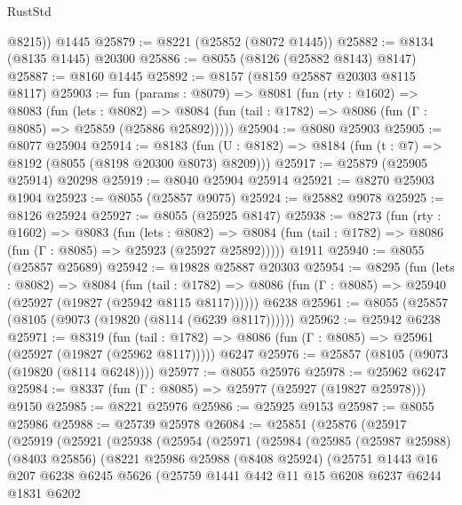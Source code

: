 \begin{lexlean}{RustStd}
\begin{coremodule}
        @8215))
    @1445
@25879 := @8221 (@25852 (@8072 @1445))
@25882 := @8134 (@8135 @1445) @20300
@25886 := @8055 (@8126 (@25882 @8143) @8147)
@25887 := @8160 @1445
@25892 := @8157 (@8159 @25887 @20303 @8115 @8117)
@25903 := fun (params : @8079) =>
  @8081
    (fun (rty : @1602) =>
    @8083
      (fun (lets : @8082) =>
      @8084 (fun (tail : @1782) => @8086 (fun (Γ : @8085) => @25859 (@25886 @25892)))))
@25904 := @8080 @25903
@25905 := @8077 @25904
@25914 := @8183
    (fun (U : @8182) => @8184 (fun (t : @7) => @8192 (@8055 (@8198 @20300 @8073) @8209)))
@25917 := @25879 (@25905 @25914) @20298
@25919 := @8040 @25904 @25914
@25921 := @8270 @25903 @1904
@25923 := @8055 (@25857 @9075)
@25924 := @25882 @9078
@25925 := @8126 @25924
@25927 := @8055 (@25925 @8147)
@25938 := @8273
    (fun (rty : @1602) =>
    @8083
      (fun (lets : @8082) =>
      @8084 (fun (tail : @1782) => @8086 (fun (Γ : @8085) => @25923 (@25927 @25892)))))
    @1911
@25940 := @8055 (@25857 @25689)
@25942 := @19828 @25887 @20303
@25954 := @8295
    (fun (lets : @8082) =>
    @8084
      (fun (tail : @1782) =>
      @8086 (fun (Γ : @8085) => @25940 (@25927 (@19827 (@25942 @8115 @8117))))))
    @6238
@25961 := @8055 (@25857 (@8105 (@9073 (@19820 (@8114 (@6239 @8117))))))
@25962 := @25942 @6238
@25971 := @8319
    (fun (tail : @1782) => @8086 (fun (Γ : @8085) => @25961 (@25927 (@19827 (@25962 @8117)))))
    @6247
@25976 := @25857 (@8105 (@9073 (@19820 (@8114 @6248))))
@25977 := @8055 @25976
@25978 := @25962 @6247
@25984 := @8337 (fun (Γ : @8085) => @25977 (@25927 (@19827 @25978))) @9150
@25985 := @8221 @25976
@25986 := @25925 @9153
@25987 := @8055 @25986
@25988 := @25739 @25978
@26084 := @25851
    (@25876
      (@25917
        (@25919
          (@25921
            (@25938
              (@25954
                (@25971
                  (@25984
                    (@25985
                      (@25987 @25988)
                      (@8403 @25856)
                      (@8221
                        @25986
                        @25988
                        (@8408 @25924)
                        (@25751
                          @1443
                          @16
                          @207
                          @6238
                          @6245
                          @5626
                          (@25759
                            @1441
                            @442
                            @11
                            @15
                            @6208
                            @6237
                            @6244
                            @1831
                            @6202

\end{coremodule}
\end{lexlean}
